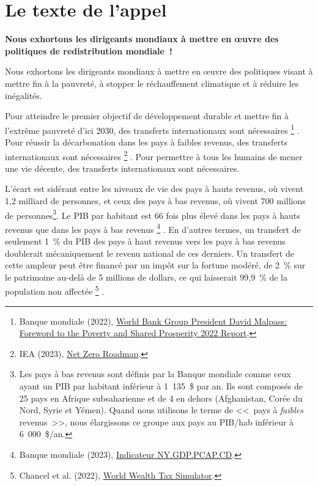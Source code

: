 \documentclass[a5paper,french,openany]{memoir}
\begin{document}
\section{Le texte de l'appel}

\begin{center}
\textbf{Nous exhortons les dirigeants mondiaux à mettre en œuvre des politiques de redistribution mondiale~!}
\end{center}

Nous exhortons les dirigeants mondiaux à mettre en œuvre des politiques visant à mettre fin à la pauvreté, à stopper le réchauffement climatique et à réduire les inégalités. 

Pour atteindre le premier objectif de développement durable et mettre fin à l'extrême pauvreté d'ici 2030, des transferts internationaux sont nécessaires
\footnote{Banque mondiale (2022), \href{https://www.worldbank.org/en/news/statement/2022/10/05/world-bank-group-president-david-malpass-foreword-to-the-poverty-and-shared-prosperity-report}{World Bank Group President David Malpass: Foreword to the Poverty and Shared Prosperity 2022 Report}.}%
. Pour réussir la décarbonation dans les pays à faibles revenus, des transferts internationaux sont nécessaires
\footnote{IEA (2023), \href{https://www.iea.org/reports/net-zero-roadmap-a-global-pathway-to-keep-the-15-0c-goal-in-reach/}{Net Zero Roadmap}.}%
. Pour permettre à tous les humains de mener une vie décente, des transferts internationaux sont nécessaires. 

L'écart est sidérant entre les niveaux de vie des pays à hauts revenus, où vivent 1,2 milliard de personnes, et ceux des pays à bas revenus, où vivent 700 millions de personnes\footnote{Les pays à bas revenus sont définis par la Banque mondiale comme ceux ayant un PIB par habitant %
inférieur à 1~135~\$ par an. Ils sont composés de 25 pays en Afrique subsaharienne et de 4 en dehors (Afghanistan, Corée du Nord, Syrie et Yémen). Quand nous utilisons le terme de <<~pays à \textit{faibles} revenus~>>, nous élargissons ce groupe aux pays au PIB/hab inférieur à 6~000~\$/an.}. %
Le PIB par habitant est 66 fois plus élevé dans les pays à hauts revenus que dans les pays à bas revenus
\footnote{Banque mondiale (2023), \href{https://data.worldbank.org/indicator/NY.GDP.PCAP.CD?end=2022\&locations=EU-ZG-XD-XM-1W-IN-US-CD-BI-LU-CN\&start=2022\&view=bar}{Indicateur NY.GDP.PCAP.CD}.}%
. En d'autres termes, un transfert de seulement 1~\% du PIB des pays à haut revenus vers les pays à bas revenus doublerait mécaniquement le revenu national de ces derniers. Un transfert de cette ampleur peut être financé par un impôt sur la fortune modéré, de 2~\% sur le patrimoine au-delà de 5 millions de dollars, ce qui laisserait 99,9~\% de la population non affectée
\footnote{Chancel et al. (2022), \href{https://wid.world/world-wealth-tax-simulator/}{World Wealth Tax Simulator}.}%
.
\end{document}
